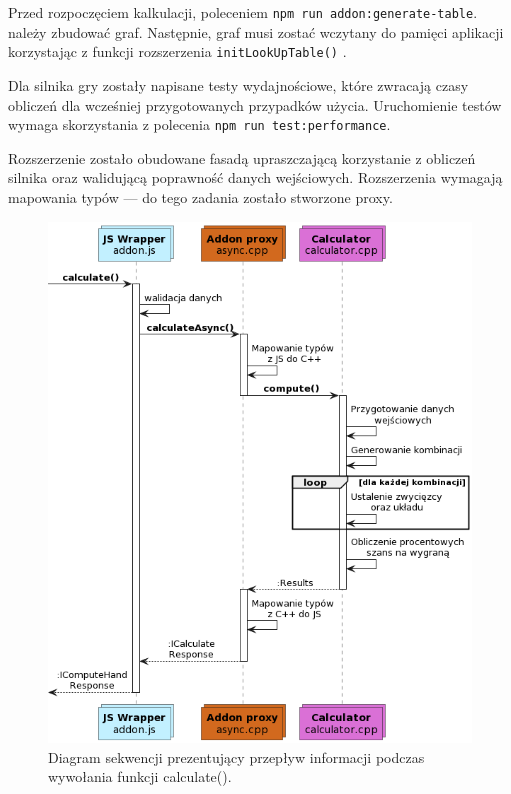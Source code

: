 Przed rozpoczęciem kalkulacji, poleceniem \verb+npm run addon:generate-table+. należy zbudować graf. Następnie, graf musi zostać wczytany do pamięci aplikacji korzystając z funkcji rozszerzenia \verb+initLookUpTable()+ .

Dla silnika gry zostały napisane testy wydajnościowe, które zwracają czasy obliczeń dla wcześniej przygotowanych przypadków użycia. Uruchomienie testów wymaga skorzystania z polecenia \verb+npm run test:performance+.

Rozszerzenie zostało obudowane fasadą upraszczającą korzystanie z obliczeń silnika oraz walidującą poprawność danych wejściowych. Rozszerzenia wymagają mapowania typów --- do tego zadania zostało stworzone proxy. 

\begin{figure}[hb]
    \includegraphics[width=\textwidth]{plantuml/out/engine-sequence-diagram.png}
    \caption{Diagram sekwencji prezentujący przepływ informacji podczas wywołania funkcji calculate(). }
    \label{fig:engine-sequence-diagram}
\end{figure}

